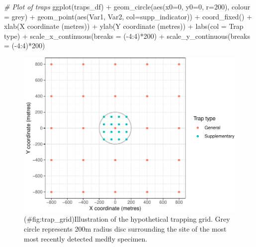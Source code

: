 \documentclass[
]{book}
\newenvironment{Shaded}{\begin{snugshade}}{\end{snugshade}}
\newcommand{\AttributeTok}[1]{\textcolor[rgb]{0.77,0.63,0.00}{#1}}
\newcommand{\CommentTok}[1]{\textcolor[rgb]{0.56,0.35,0.01}{\textit{#1}}}
\newcommand{\DecValTok}[1]{\textcolor[rgb]{0.00,0.00,0.81}{#1}}
\newcommand{\FunctionTok}[1]{\textcolor[rgb]{0.00,0.00,0.00}{#1}}
\newcommand{\NormalTok}[1]{#1}
\newcommand{\SpecialCharTok}[1]{\textcolor[rgb]{0.00,0.00,0.00}{#1}}
\newcommand{\StringTok}[1]{\textcolor[rgb]{0.31,0.60,0.02}{#1}}
\begin{document}
\begin{Shaded}
\begin{Highlighting}[]
\CommentTok{\# Plot of traps}
\FunctionTok{ggplot}\NormalTok{(traps\_df) }\SpecialCharTok{+}
  \FunctionTok{geom\_circle}\NormalTok{(}\FunctionTok{aes}\NormalTok{(}\AttributeTok{x0=}\DecValTok{0}\NormalTok{, }\AttributeTok{y0=}\DecValTok{0}\NormalTok{, }\AttributeTok{r=}\DecValTok{200}\NormalTok{), }\AttributeTok{colour =} \StringTok{\textquotesingle{}grey\textquotesingle{}}\NormalTok{) }\SpecialCharTok{+}
  \FunctionTok{geom\_point}\NormalTok{(}\FunctionTok{aes}\NormalTok{(Var1, Var2, }\AttributeTok{col=}\NormalTok{supp\_indicator)) }\SpecialCharTok{+}
  \FunctionTok{coord\_fixed}\NormalTok{() }\SpecialCharTok{+}
  \FunctionTok{xlab}\NormalTok{(}\StringTok{\textquotesingle{}X coordinate (metres)\textquotesingle{}}\NormalTok{) }\SpecialCharTok{+}
  \FunctionTok{ylab}\NormalTok{(}\StringTok{\textquotesingle{}Y coordinate (metres)\textquotesingle{}}\NormalTok{) }\SpecialCharTok{+}
  \FunctionTok{labs}\NormalTok{(}\AttributeTok{col =} \StringTok{\textquotesingle{}Trap type\textquotesingle{}}\NormalTok{) }\SpecialCharTok{+}
  \FunctionTok{scale\_x\_continuous}\NormalTok{(}\AttributeTok{breaks =}\NormalTok{ (}\SpecialCharTok{{-}}\DecValTok{4}\SpecialCharTok{:}\DecValTok{4}\NormalTok{)}\SpecialCharTok{*}\DecValTok{200}\NormalTok{) }\SpecialCharTok{+}
  \FunctionTok{scale\_y\_continuous}\NormalTok{(}\AttributeTok{breaks =}\NormalTok{ (}\SpecialCharTok{{-}}\DecValTok{4}\SpecialCharTok{:}\DecValTok{4}\NormalTok{)}\SpecialCharTok{*}\DecValTok{200}\NormalTok{) }
\end{Highlighting}
\end{Shaded}

\begin{figure}
\centering
\includegraphics{_main_files/figure-latex/trap_grid-1.pdf}
\caption{(\#fig:trap\_grid)Illustration of the hypothetical trapping grid. Grey circle represents 200m radius disc surrounding the site of the most most recently detected medfly specimen.}
\end{figure}
\end{document}
